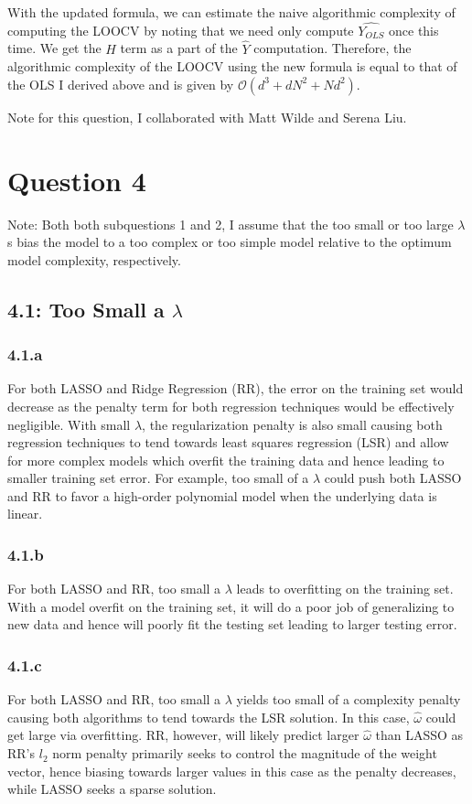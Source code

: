 \documentclass[12pt]{amsart}
\begin{document}
With the updated formula, we can estimate the naive algorithmic complexity of computing the LOOCV by noting that we need only compute $\hat{Y_{OLS}}$ once this time.  We get the $H$ term as a part of the $\hat{Y}$ computation.  Therefore, the algorithmic complexity of the LOOCV using the new formula is equal to that of the OLS I derived above and is given by $\mathcal{O}(d^3 + dN^2 + Nd^2)$.

Note for this question, I collaborated with Matt Wilde and Serena Liu.


\section*{Question 4}

Note: Both both subquestions 1 and 2, I assume that the too small or too large $\lambda$s bias the model to a too complex or too simple model relative to the optimum model complexity, respectively.

\subsection*{4.1: Too Small a $\lambda$}
\subsubsection*{4.1.a}
For both LASSO and Ridge Regression (RR), the error on the training set would decrease as the penalty term for both regression techniques would be effectively negligible.  With small $\lambda$, the regularization penalty is also small causing both regression techniques to tend towards least squares regression (LSR) and allow for more complex models which overfit the training data and hence leading to smaller training set error.  For example, too small of a $\lambda$ could push both LASSO and RR to favor a high-order polynomial model when the underlying data is linear.

\subsubsection*{4.1.b}
For both LASSO and RR, too small a $\lambda$ leads to overfitting on the training set.  With a model overfit on the training set, it will do a poor job of generalizing to new data and hence will poorly fit the testing set leading to larger testing error.

\subsubsection*{4.1.c}
For both LASSO and RR, too small a $\lambda$ yields too small of a complexity penalty causing both algorithms to tend towards the LSR solution.  In this case, $\hat{\omega}$ could get large via overfitting.  RR, however, will likely predict larger $\hat{\omega}$ than LASSO as RR's $l_2$ norm penalty primarily seeks to control the magnitude of the weight vector, hence biasing towards larger values in this case as the penalty decreases, while LASSO seeks a sparse solution.
\end{document}
